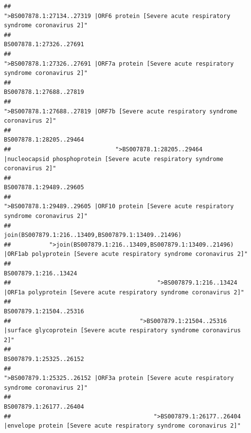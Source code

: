 \documentclass[
]{article}
\begin{document}
\begin{verbatim}
##                                             ">BS007878.1:27134..27319 |ORF6 protein [Severe acute respiratory syndrome coronavirus 2]" 
##                                                                                                                BS007878.1:27326..27691 
##                                            ">BS007878.1:27326..27691 |ORF7a protein [Severe acute respiratory syndrome coronavirus 2]" 
##                                                                                                                BS007878.1:27688..27819 
##                                                    ">BS007878.1:27688..27819 |ORF7b [Severe acute respiratory syndrome coronavirus 2]" 
##                                                                                                                BS007878.1:28205..29464 
##                              ">BS007878.1:28205..29464 |nucleocapsid phosphoprotein [Severe acute respiratory syndrome coronavirus 2]" 
##                                                                                                                BS007878.1:29489..29605 
##                                            ">BS007878.1:29489..29605 |ORF10 protein [Severe acute respiratory syndrome coronavirus 2]" 
##                                                                                    join(BS007879.1:216..13409,BS007879.1:13409..21496) 
##           ">join(BS007879.1:216..13409,BS007879.1:13409..21496) |ORF1ab polyprotein [Severe acute respiratory syndrome coronavirus 2]" 
##                                                                                                                  BS007879.1:216..13424 
##                                          ">BS007879.1:216..13424 |ORF1a polyprotein [Severe acute respiratory syndrome coronavirus 2]" 
##                                                                                                                BS007879.1:21504..25316 
##                                     ">BS007879.1:21504..25316 |surface glycoprotein [Severe acute respiratory syndrome coronavirus 2]" 
##                                                                                                                BS007879.1:25325..26152 
##                                            ">BS007879.1:25325..26152 |ORF3a protein [Severe acute respiratory syndrome coronavirus 2]" 
##                                                                                                                BS007879.1:26177..26404 
##                                         ">BS007879.1:26177..26404 |envelope protein [Severe acute respiratory syndrome coronavirus 2]" 

\end{verbatim}
\end{document}
